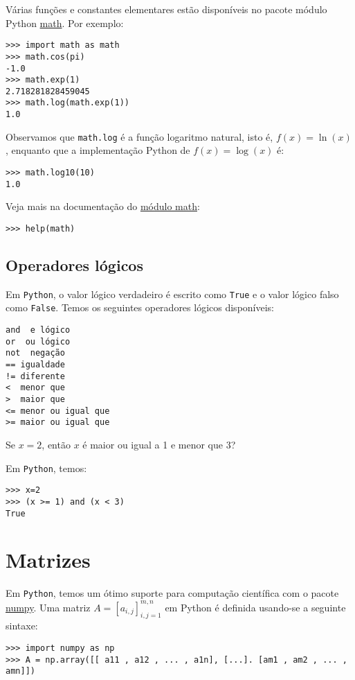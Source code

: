 Várias funções e constantes elementares estão disponíveis no pacote módulo Python \href{https://docs.python.org/3/library/math.html?highlight=math#module-math}{math}. Por exemplo:
\begin{verbatim}
>>> import math as math
>>> math.cos(pi)
-1.0
>>> math.exp(1)
2.718281828459045
>>> math.log(math.exp(1))
1.0
\end{verbatim}

Observamos que \verb+math.log+ é a função logaritmo natural, isto é, $f(x) = \ln(x)$, enquanto que a implementação Python de $f(x) = \log(x)$ é:
\begin{verbatim}
>>> math.log10(10)
1.0
\end{verbatim}
Veja mais na documentação do \href{https://docs.python.org/3/library/math.html?highlight=math#module-math}{módulo math}:
\begin{verbatim}
>>> help(math)
\end{verbatim}

\subsection{Operadores lógicos}

Em \verb+Python+, o valor lógico verdadeiro é escrito como \verb+True+ e o valor lógico falso como \verb+False+. Temos os seguintes operadores lógicos disponíveis:
\begin{verbatim}
and  e lógico
or  ou lógico
not  negação
== igualdade
!= diferente
<  menor que
>  maior que
<= menor ou igual que
>= maior ou igual que
\end{verbatim}

\begin{ex}
  Se $x=2$, então $x$ é maior ou igual a 1 e menor que 3? 
\end{ex}
\begin{sol}
  Em \verb+Python+, temos:
\begin{verbatim}
>>> x=2
>>> (x >= 1) and (x < 3)
True
\end{verbatim}
\end{sol}

\section{Matrizes}

Em \verb+Python+, temos um ótimo suporte para computação científica com o pacote \href{http://www.numpy.org/}{numpy}. Uma matriz $A = [a_{i,j}]_{i,j=1}^{m,n}$ em Python é definida usando-se a seguinte sintaxe:
\begin{verbatim}
>>> import numpy as np
>>> A = np.array([[ a11 , a12 , ... , a1n], [...]. [am1 , am2 , ... , amn]])
\end{verbatim}

